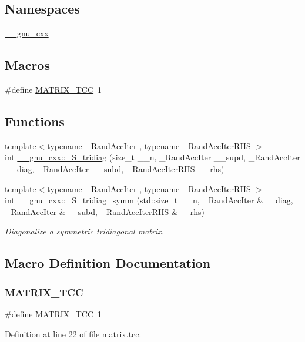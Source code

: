 \subsection*{Namespaces}
\begin{DoxyCompactItemize}
\item 
 \hyperlink{namespace____gnu__cxx}{\+\_\+\+\_\+gnu\+\_\+cxx}
\end{DoxyCompactItemize}
\subsection*{Macros}
\begin{DoxyCompactItemize}
\item 
\#define \hyperlink{matrix_8tcc_a970f96e7f8c79cd72af477aa073d7781}{M\+A\+T\+R\+I\+X\+\_\+\+T\+CC}~1
\end{DoxyCompactItemize}
\subsection*{Functions}
\begin{DoxyCompactItemize}
\item 
{\footnotesize template$<$typename \+\_\+\+Rand\+Acc\+Iter , typename \+\_\+\+Rand\+Acc\+Iter\+R\+HS $>$ }\\int \hyperlink{namespace____gnu__cxx_a4e853338765c8d1dc659feedb9813e2a}{\+\_\+\+\_\+gnu\+\_\+cxx\+::\+\_\+\+S\+\_\+tridiag} (size\+\_\+t \+\_\+\+\_\+n, \+\_\+\+Rand\+Acc\+Iter \+\_\+\+\_\+supd, \+\_\+\+Rand\+Acc\+Iter \+\_\+\+\_\+diag, \+\_\+\+Rand\+Acc\+Iter \+\_\+\+\_\+subd, \+\_\+\+Rand\+Acc\+Iter\+R\+HS \+\_\+\+\_\+rhs)
\item 
{\footnotesize template$<$typename \+\_\+\+Rand\+Acc\+Iter , typename \+\_\+\+Rand\+Acc\+Iter\+R\+HS $>$ }\\int \hyperlink{namespace____gnu__cxx_a4b9501d94b3eebf5f1ffe990b81cae93}{\+\_\+\+\_\+gnu\+\_\+cxx\+::\+\_\+\+S\+\_\+tridiag\+\_\+symm} (std\+::size\+\_\+t \+\_\+\+\_\+n, \+\_\+\+Rand\+Acc\+Iter \&\+\_\+\+\_\+diag, \+\_\+\+Rand\+Acc\+Iter \&\+\_\+\+\_\+subd, \+\_\+\+Rand\+Acc\+Iter\+R\+HS \&\+\_\+\+\_\+rhs)
\begin{DoxyCompactList}\small\item\em Diagonalize a symmetric tridiagonal matrix. \end{DoxyCompactList}\end{DoxyCompactItemize}


\subsection{Macro Definition Documentation}
\mbox{\label{matrix_8tcc_a970f96e7f8c79cd72af477aa073d7781}} 
\subsubsection{\texorpdfstring{M\+A\+T\+R\+I\+X\+\_\+\+T\+CC}{MATRIX\_TCC}}
{\footnotesize\ttfamily \#define M\+A\+T\+R\+I\+X\+\_\+\+T\+CC~1}



Definition at line 22 of file matrix.\+tcc.

